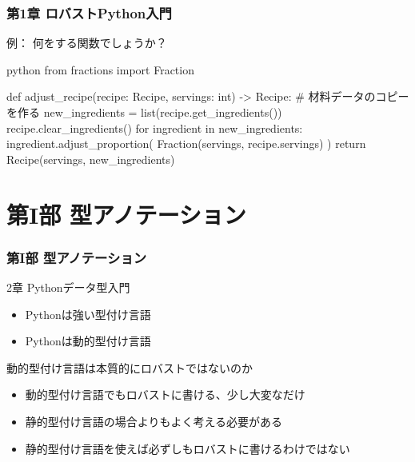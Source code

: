 \documentclass[aspectratio=169,dvipdfmx,12pt,notheorems]{beamer}
\theoremstyle{definition}
\begin{document}
\begin{frame}[fragile]\frametitle{第1章 ロバストPython入門}

\begin{exampleblock}{例： 何をする関数でしょうか？}
\begin{pygments}{python}
from fractions import Fraction

def adjust_recipe(recipe: Recipe, servings: int) -> Recipe:
    # 材料データのコピーを作る
    new_ingredients = list(recipe.get_ingredients())
    recipe.clear_ingredients()
    for ingredient in new_ingredients:
        ingredient.adjust_proportion(
            Fraction(servings, recipe.servings)
        )
    return Recipe(servings, new_ingredients)
\end{pygments}
\end{exampleblock}

\end{frame}

\section{第I部 型アノテーション}

\begin{frame}\frametitle{第I部 型アノテーション}

\begin{block}{2章 Pythonデータ型入門}
\begin{itemize}
\item Pythonは強い型付け言語
\item Pythonは動的型付け言語
\end{itemize}

\end{block}

\begin{alertblock}{動的型付け言語は本質的にロバストではないのか}
\begin{itemize}
\item 動的型付け言語でもロバストに書ける、少し大変なだけ
\item 静的型付け言語の場合よりもよく考える必要がある
\item 静的型付け言語を使えば必ずしもロバストに書けるわけではない
\end{itemize}
\end{alertblock}

\end{frame}
\end{document}
